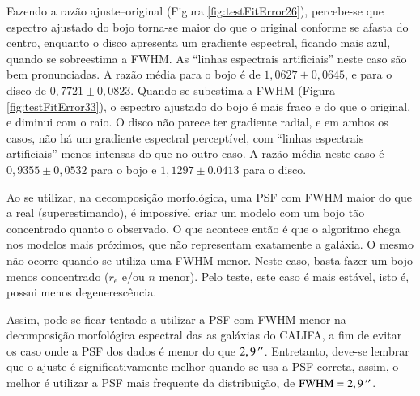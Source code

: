 Fazendo a razão ajuste--original (Figura \ref{fig:testFitError26}), percebe-se
que espectro ajustado do bojo torna-se maior do que o original conforme se
afasta do centro, enquanto o disco apresenta um gradiente espectral, ficando
mais azul, quando se sobreestima a FWHM. As ``linhas espectrais artificiais''
neste caso são bem pronunciadas. A razão média para o bojo é de $1,0627 \pm
0,0645$, e para o disco de $0,7721 \pm 0,0823$. Quando se subestima a FWHM
(Figura \ref{fig:testFitError33}), o espectro ajustado do bojo é mais fraco e do
que o original, e diminui com o raio. O disco não parece ter gradiente radial, e
em ambos os casos, não há um gradiente espectral perceptível, com ``linhas
espectrais artificiais'' menos intensas do que no outro caso. A razão média
neste caso é $0,9355 \pm 0,0532$ para o bojo e $1,1297 \pm 0.0413$ para o disco.

Ao se utilizar, na decomposição morfológica, uma PSF com FWHM maior do que a
real (superestimando), é impossível criar um modelo com um bojo tão concentrado
quanto o observado. O que acontece então é que o algoritmo chega nos modelos
mais próximos, que não representam exatamente a galáxia. O mesmo não ocorre
quando se utiliza uma FWHM menor. Neste caso, basta fazer um bojo menos
concentrado ($r_e$ e/ou $n$ menor). Pelo teste, este caso é mais estável, isto
é, possui menos degenerescência.

Assim, pode-se ficar tentado a utilizar a PSF com FWHM menor na decomposição
morfológica espectral das as galáxias do CALIFA, a fim de evitar os caso onde a
PSF dos dados é menor do que $2,9\,^{\prime\prime}$. Entretanto, deve-se lembrar que o
ajuste é significativamente melhor quando se usa a PSF correta, assim, o melhor
é utilizar a PSF mais frequente da distribuição, de $\mathrm{FWHM} =
2,9\,^{\prime\prime}$.


